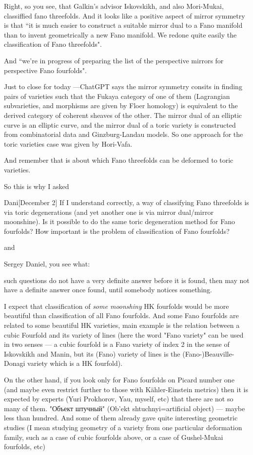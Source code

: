 Right, so you see, that Galkin's advisor Iskovskikh, and also Mori-Mukai, classiffied fano threefolds. And it looks like a positive aspect of mirror symmetry is that {\color{5}“it is much easier to construct a suitable mirror dual to a Fano manifold than to invent geometrically a new Fano manifold. We redone quite easily the classification of Fano threefolds"}.

And {\color{3}“we're in progress of preparing the list of the perspective mirrors for perspective Fano fourfolds"}.

Just to close for today ---ChatGPT says the mirror symmetry consits in finding pairs of varieties such that the Fukaya category of one of them (Lagrangian subvarieties, and morphisms are given by Floer homology) is equivalent to the derived category of coherent sheaves of the other. The mirror dual of an elliptic curve is an elliptic curve, and the mirror dual of a toric variety is constructed from combinatorial data and Ginzburg-Landau models. So one approach for the toric varieties case was given by Hori-Vafa.

And remember that \cite{galkin1} is about which Fano threefolds can be deformed to toric varieties.

So this is why I asked

\begin{thing1}{Dani}[December 2]\leavevmode
	If I understand correctly, a way of classifying Fano threefolds is via toric degenerations (and yet another one is via mirror dual/mirror moonshine). Is it possible to do the same toric degeneration method for Fano fourfolds? How important is the problem of classification of Fano fourfolds?
\end{thing1}

and

\begin{thing14}{Sergey}\leavevmode
	Daniel, you see what:

such questions do not have a very definite answer before it is found,
then may not have a definite answer once found, until somebody notices something.

I expect that classification of \textit{some moonshiny} HK fourfolds would be more beautiful than classification of all Fano fourfolds. And some Fano fourfolds are related to some beautiful HK varieties, main example is the relation between a cubic Fourfold and its variety of lines (here the word "Fano variety" can be used in two senses — a cubic fourfold is a Fano variety of index 2 in the sense of Iskovskikh and Manin, but its (Fano) variety of lines is the (Fano-)Beauville-Donagi variety which is a HK fourfold).

On the other hand, if you look only for Fano fourfolds on Picard number one (and maybe even restrict further to those with Kähler-Einstein metrics) then it is expected by experts (Yuri Prokhorov, Yau, myself, etc) that there are not so many of them. "Объект штучный" (Ob'ekt shtuchnyi=artificial object) — maybe less than hundred. And some of them already gave quite interesting geometric studies (I mean studying geometry of a variety from one particular deformation family, such as a case of cubic fourfolds above, or a case of Gushel-Mukai fourfolds, etc)
\end{thing14}

